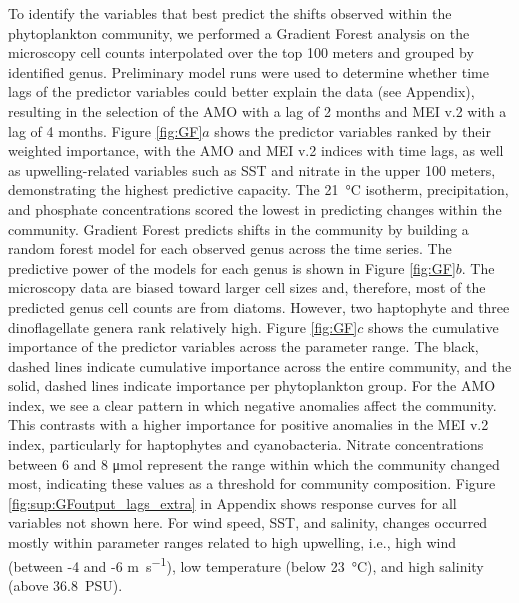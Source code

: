 \documentclass[draft]{agujournal2019}
\begin{document}
To identify the variables that best predict the shifts observed within the phytoplankton community, we performed a Gradient Forest analysis on the microscopy cell counts interpolated over the top 100 meters and grouped by identified genus. Preliminary model runs were used to determine whether time lags of the predictor variables could better explain the data (see Appendix), resulting in the selection of the AMO with a lag of 2 months and MEI v.2 with a lag of 4 months. Figure \ref{fig:GF}$a$ shows the predictor variables ranked by their weighted importance, with the AMO and MEI v.2 indices with time lags, as well as upwelling-related variables such as SST and nitrate in the upper 100 meters, demonstrating the highest predictive capacity. The \qty{21}{\celsius} isotherm, precipitation, and phosphate concentrations scored the lowest in predicting changes within the community. Gradient Forest predicts shifts in the community by building a random forest model for each observed genus across the time series. The predictive power of the models for each genus is shown in Figure \ref{fig:GF}$b$. The microscopy data are biased toward larger cell sizes and, therefore, most of the predicted genus cell counts are from diatoms. However, two haptophyte and three dinoflagellate genera rank relatively high.
Figure \ref{fig:GF}$c$ shows the cumulative importance of the predictor variables across the parameter range. The black, dashed lines indicate cumulative importance across the entire community, and the solid, dashed lines indicate importance per phytoplankton group. For the AMO index, we see a clear pattern in which negative anomalies affect the community. This contrasts with a higher importance for positive anomalies in the MEI v.2 index, particularly for haptophytes and cyanobacteria. Nitrate concentrations between 6 and 8 \unit{\micro \mole} represent the range within which the community changed most, indicating these values as a threshold for community composition. Figure \ref{fig:sup:GFoutput_lags_extra} in Appendix shows response curves for all variables not shown here. For wind speed, SST, and salinity, changes occurred mostly within parameter ranges related to high upwelling, i.e., high wind (between -4 and -6 \unit{m.s^{-1}}), low temperature (below \qty{23}{\celsius}), and high salinity (above \qty{36.8}{PSU}). 
\end{document}
